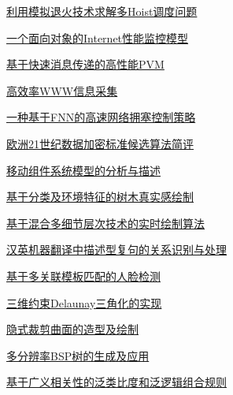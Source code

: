 \documentclass[a4paper]{article}
\begin{document}
\href{http://www.jos.org.cn/ch/reader/download_pdf.aspx?file_no=20010102&year_id=2001&quarter_id=1&falg=1}{利用模拟退火技术求解多Hoist调度问题}

\href{http://www.jos.org.cn/ch/reader/download_pdf.aspx?file_no=20010103&year_id=2001&quarter_id=1&falg=1}{一个面向对象的Internet性能监控模型}

\href{http://www.jos.org.cn/ch/reader/download_pdf.aspx?file_no=20010104&year_id=2001&quarter_id=1&falg=1}{基于快速消息传递的高性能PVM}

\href{http://www.jos.org.cn/ch/reader/download_pdf.aspx?file_no=20010105&year_id=2001&quarter_id=1&falg=1}{高效率WWW信息采集}

\href{http://www.jos.org.cn/ch/reader/download_pdf.aspx?file_no=20010106&year_id=2001&quarter_id=1&falg=1}{一种基于FNN的高速网络拥塞控制策略}

\href{http://www.jos.org.cn/ch/reader/download_pdf.aspx?file_no=20010107&year_id=2001&quarter_id=1&falg=1}{欧洲21世纪数据加密标准候选算法简评}

\href{http://www.jos.org.cn/ch/reader/download_pdf.aspx?file_no=20010108&year_id=2001&quarter_id=1&falg=1}{移动组件系统模型的分析与描述}

\href{http://www.jos.org.cn/ch/reader/download_pdf.aspx?file_no=20010109&year_id=2001&quarter_id=1&falg=1}{基于分类及环境特征的树木真实感绘制}

\href{http://www.jos.org.cn/ch/reader/download_pdf.aspx?file_no=20010110&year_id=2001&quarter_id=1&falg=1}{基于混合多细节层次技术的实时绘制算法}

\href{http://www.jos.org.cn/ch/reader/download_pdf.aspx?file_no=20010111&year_id=2001&quarter_id=1&falg=1}{汉英机器翻译中描述型复句的关系识别与处理}

\href{http://www.jos.org.cn/ch/reader/download_pdf.aspx?file_no=20010112&year_id=2001&quarter_id=1&falg=1}{基于多关联模板匹配的人脸检测}

\href{http://www.jos.org.cn/ch/reader/download_pdf.aspx?file_no=20010113&year_id=2001&quarter_id=1&falg=1}{三维约束Delaunay三角化的实现}

\href{http://www.jos.org.cn/ch/reader/download_pdf.aspx?file_no=20010114&year_id=2001&quarter_id=1&falg=1}{隐式裁剪曲面的造型及绘制}

\href{http://www.jos.org.cn/ch/reader/download_pdf.aspx?file_no=20010115&year_id=2001&quarter_id=1&falg=1}{多分辨率BSP树的生成及应用}

\href{http://www.jos.org.cn/ch/reader/download_pdf.aspx?file_no=20010116&year_id=2001&quarter_id=1&falg=1}{基于广义相关性的泛类比度和泛逻辑组合规则}
\end{document}
